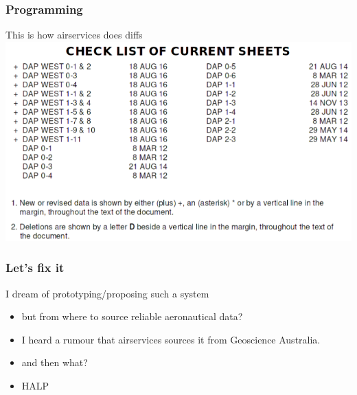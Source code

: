 \begin{frame}
\frametitle{Programming}
\begin{block}{This is how airservices does diffs}
\includegraphics[height=0.42\textheight]{image/dap-diff.png}
\end{block}
\end{frame}

\begin{frame}
\frametitle{Let's fix it}
\begin{block}{I dream of prototyping/proposing such a system}
\begin{itemize}
\item<1-> but from where to source reliable aeronautical data?
\item<2-> I heard a rumour that airservices sources it from Geoscience Australia.
\item<3-> and then what?
\item<4-> HALP
\end{itemize}
\end{block}
\end{frame}
